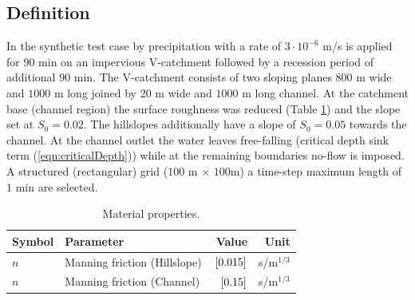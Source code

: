\subsection{Definition}
%
In the synthetic test case by \cite{Gian:96} precipitation with a rate of $3 \cdot 10^{-6}$ m/s 
is applied for $90$ min on an impervious V-catchment followed by a recession period of additional $90$ min.
The V-catchment consists of two sloping planes $800$ m wide and $1000$ m long joined by $20$ m wide and $1000$ m long channel.
At the catchment base (channel region) the surface roughness was reduced (Table \ref{tab-V-catch}) and the slope set at 
$S_0 = 0.02$. The hillslopes additionally have a slope of $S_0 = 0.05$ towards the channel. 
At the channel outlet the water leaves free-falling (critical depth sink term (\ref{eqn:criticalDepth})) 
while at the remaining boundaries no-flow is imposed.
A structured (rectangular) grid ($100$ m $\times$ $100$m) a time-step maximum length of $1$ min are selected.
%
\begin{table}[!htbp]
\caption{\label{tab-V-catch}Material properties.}
\begin{center}
\begin{tabular}{llrr}
\toprule
Symbol & Parameter & Value & Unit \\
\midrule
$n$ & Manning friction (Hillslope)	  & $\, \mathrm{[}0.015]{}$   & s/m$^{1/3}$ \\
$n$ & Manning friction (Channel)	  & $\, \mathrm{[}0.15]{}$   & s/m$^{1/3}$ \\
\bottomrule
\end{tabular}
\end{center}
\end{table}
%

